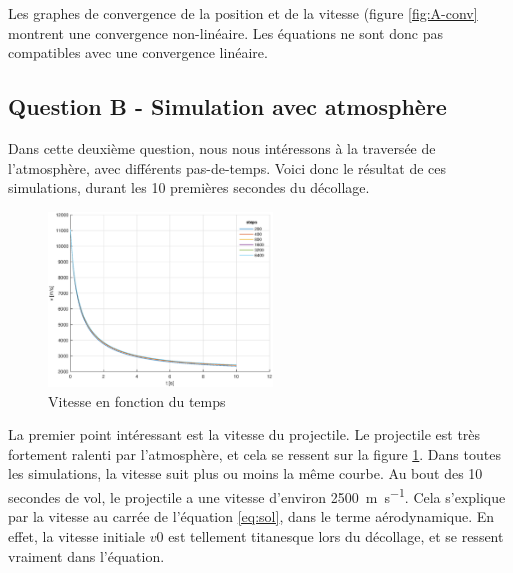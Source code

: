 \documentclass[a4paper,12pt,twoside]{article}
\begin{document}
Les graphes de convergence de la position et de la vitesse (figure \ref{fig:A-conv} montrent une convergence non-linéaire. Les équations ne sont donc pas compatibles avec une convergence linéaire.

\subsection{Question B - Simulation avec atmosphère}
Dans cette deuxième question, nous nous intéressons à la traversée de l'atmosphère, avec différents pas-de-temps. Voici donc le résultat de ces simulations, durant les 10 premières secondes du décollage.\\

\begin{figure}[h]
	\centering
    \includegraphics[width=0.53\textwidth]{graphs/vB.eps}
    \caption{Vitesse en fonction du temps}
    \label{fig:B-vt}
\end{figure}

La premier point intéressant est la vitesse du projectile. Le projectile est très fortement ralenti par l'atmosphère, et cela se ressent sur la figure \ref{fig:B-vt}. Dans toutes les simulations, la vitesse suit plus ou moins la même courbe. Au bout des 10 secondes de vol, le projectile a une vitesse d'environ \SI{2500}{\meter\per\second}. Cela s'explique par la vitesse au carrée de l'équation \ref{eq:sol}, dans le terme aérodynamique. En effet, la vitesse initiale $v0$ est tellement titanesque lors du décollage, et se ressent vraiment dans l'équation.\\

\end{document}
